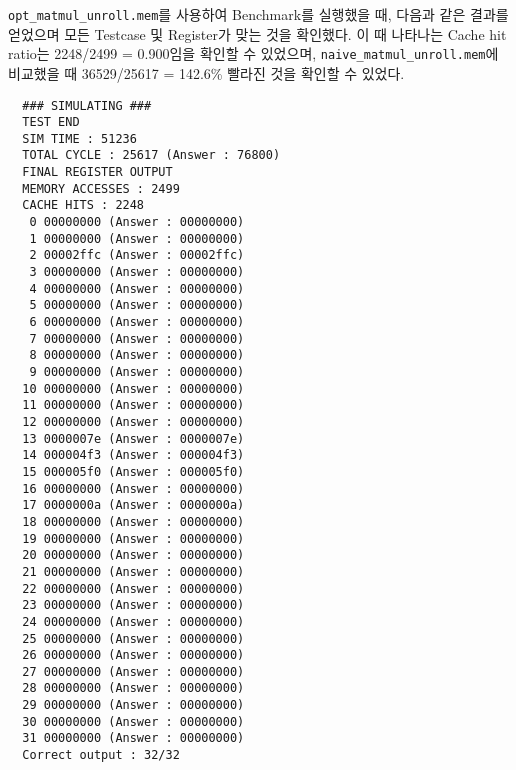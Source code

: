 \documentclass{scrartcl}
\begin{document}
\texttt{opt\_matmul\_unroll.mem}를 사용하여 Benchmark를 실행했을 때, 다음과 같은 결과를 얻었으며 모든 Testcase 및 Register가 맞는 것을 확인했다.
이 때 나타나는 Cache hit ratio는 2248/2499 = 0.900임을 확인할 수 있었으며, \texttt{naive\_matmul\_unroll.mem}에 비교했을 때 36529/25617 = 142.6\% 빨라진 것을 확인할 수 있었다.

\begin{lstlisting}
  ### SIMULATING ###
  TEST END
  SIM TIME : 51236
  TOTAL CYCLE : 25617 (Answer : 76800)
  FINAL REGISTER OUTPUT
  MEMORY ACCESSES : 2499
  CACHE HITS : 2248
   0 00000000 (Answer : 00000000)
   1 00000000 (Answer : 00000000)
   2 00002ffc (Answer : 00002ffc)
   3 00000000 (Answer : 00000000)
   4 00000000 (Answer : 00000000)
   5 00000000 (Answer : 00000000)
   6 00000000 (Answer : 00000000)
   7 00000000 (Answer : 00000000)
   8 00000000 (Answer : 00000000)
   9 00000000 (Answer : 00000000)
  10 00000000 (Answer : 00000000)
  11 00000000 (Answer : 00000000)
  12 00000000 (Answer : 00000000)
  13 0000007e (Answer : 0000007e)
  14 000004f3 (Answer : 000004f3)
  15 000005f0 (Answer : 000005f0)
  16 00000000 (Answer : 00000000)
  17 0000000a (Answer : 0000000a)
  18 00000000 (Answer : 00000000)
  19 00000000 (Answer : 00000000)
  20 00000000 (Answer : 00000000)
  21 00000000 (Answer : 00000000)
  22 00000000 (Answer : 00000000)
  23 00000000 (Answer : 00000000)
  24 00000000 (Answer : 00000000)
  25 00000000 (Answer : 00000000)
  26 00000000 (Answer : 00000000)
  27 00000000 (Answer : 00000000)
  28 00000000 (Answer : 00000000)
  29 00000000 (Answer : 00000000)
  30 00000000 (Answer : 00000000)
  31 00000000 (Answer : 00000000)
  Correct output : 32/32
\end{lstlisting}
\end{document}
